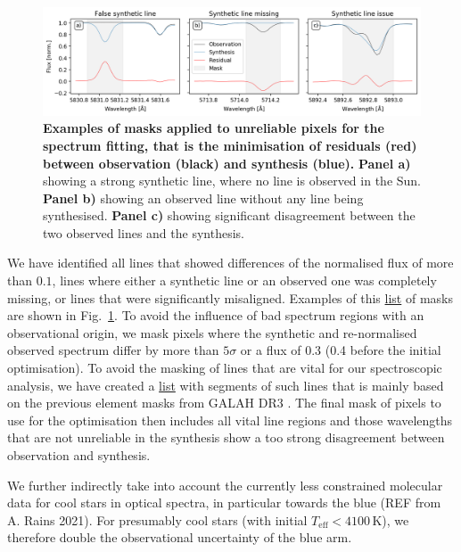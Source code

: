 \documentclass[
  journal=pasa,
  manuscript=research-paper, %
  year=2021,
  volume=37
]{cup-journal}
\begin{document}
\begin{figure}[hbt!]
 \centering  
 \includegraphics[width=\textwidth]{figures/example_masking_sun.png}
\caption{\textbf{Examples of masks applied to unreliable pixels for the spectrum fitting, that is the minimisation of residuals (red) between observation (black) and synthesis (blue).} \textbf{Panel a)} showing a strong synthetic line, where no line is observed in the Sun. \textbf{Panel b)} showing an observed line without any line being synthesised. \textbf{Panel c)} showing significant disagreement between the two observed lines and the synthesis.} \label{fig:example_masking_sun}
\end{figure}

We have identified all lines that showed differences of the normalised flux of more than $0.1$, lines where either a synthetic line or an observed one was completely missing, or lines that were significantly misaligned. Examples of this \href{https://github.com/svenbuder/GALAH_DR4/blob/main/spectrum_analysis/spectrum_masks/solar_spectrum_mask.fits}{list} of masks are shown in Fig.~\ref{fig:example_masking_sun}. To avoid the influence of bad spectrum regions with an observational origin, we mask pixels where the synthetic and re-normalised observed spectrum differ by more than $5\sigma$ or a flux of 0.3 (0.4 before the initial optimisation). To avoid the masking of lines that are vital for our spectroscopic analysis, we have created a \href{https://github.com/svenbuder/GALAH_DR4/blob/main/spectrum_analysis/spectrum_masks/vital_lines.fits}{list} with segments of such lines that is mainly based on the previous element masks from GALAH DR3 \citep{Buder2021}. The final mask of pixels to use for the optimisation then includes all vital line regions and those wavelengths that are not unreliable in the synthesis show a too strong disagreement between observation and synthesis.

We further indirectly take into account the currently less constrained molecular data for cool stars in optical spectra, in particular towards the blue (REF from A. Rains 2021). For presumably cool stars (with initial $T_\text{eff} < 4100\,\mathrm{K}$), we therefore double the observational uncertainty of the blue arm.
\end{document}

